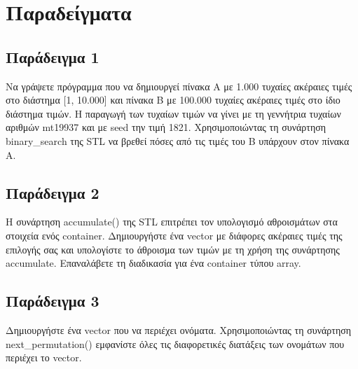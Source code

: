 




\section{Παραδείγματα}
\subsection{Παράδειγμα 1}
Να γράψετε πρόγραμμα που να δημιουργεί πίνακα Α με 1.000 τυχαίες ακέραιες τιμές στο διάστημα [1, 10.000] και πίνακα Β με 100.000 τυχαίες ακέραιες τιμές στο ίδιο διάστημα τιμών. Η παραγωγή των τυχαίων τιμών να γίνει με τη γεννήτρια τυχαίων αριθμών mt19937 και με seed την τιμή 1821. Χρησιμοποιώντας τη συνάρτηση binary\_search της STL να βρεθεί πόσες από τις τιμές του Β υπάρχουν στον πίνακα Α.






\subsection{Παράδειγμα 2}
Η συνάρτηση accumulate() της STL επιτρέπει τον υπολογισμό αθροισμάτων στα στοιχεία ενός container. Δημιουργήστε ένα vector με διάφορες ακέραιες τιμές της επιλογής σας και υπολογίστε το άθροισμα των τιμών με τη χρήση της συνάρτησης accumulate. Επαναλάβετε τη διαδικασία για ένα container τύπου array.





\subsection{Παράδειγμα 3}
Δημιουργήστε ένα vector που να περιέχει ονόματα. Χρησιμοποιώντας τη συνάρτηση next\_permutation() εμφανίστε όλες τις διαφορετικές διατάξεις των ονομάτων που περιέχει το vector.





